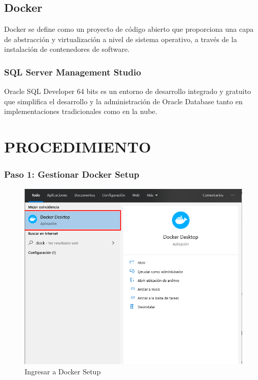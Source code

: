 \documentclass[preprint,12pt]{elsarticle}
\begin{document}

\subsection {\textbf{Docker}}
Docker se define como un proyecto de código abierto que proporciona una capa de abstracción y virtualización a nivel de sistema operativo, a través de la instalación de contenedores de software.
\subsubsection{\textbf{SQL Server Management Studio}}
Oracle SQL Developer 64 bits es un entorno de desarrollo integrado y gratuito que simplifica el desarrollo y la administración de Oracle Database tanto en implementaciones tradicionales como en la nube.


\section{PROCEDIMIENTO}

\subsubsection{\textbf{Paso 1: Gestionar Docker Setup}}
\begin{figure}[H]
	\begin{center}
		\includegraphics[width=12cm]{./IMAGENES/foto1} 
		\caption{Ingresar a Docker Setup}
	\end{center}
\end{figure}
\end{document}
